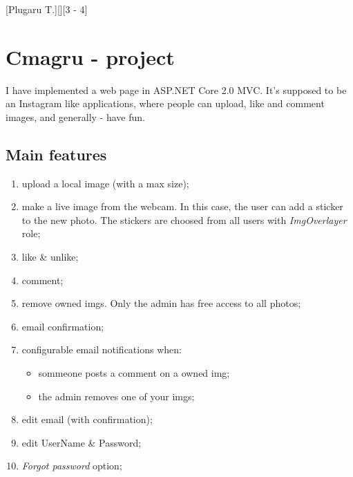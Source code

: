 \documentclass{article}
\begin{document}
	[Plugaru T.][][3 - 4]

	\section{Cmagru - project}
		I have implemented a web page in ASP.NET Core 2.0 MVC. It's supposed to be an Instagram like applications, where people can upload, like and comment images, and generally - have fun.

		\subsection{Main features}
			\begin{enumerate}
				\item upload a local image (with a max size);
				\item make a live image from the webcam. In this case, the user can add a sticker to the new photo. The stickers are choosed from all users with \textit{ImgOverlayer} role;
				\item like \& unlike;
				\item comment;
				\item remove owned imgs. Only the admin has free access to all photos;
				\item email confirmation;
				\item configurable email notifications when:
					\begin{itemize}
						\item sommeone posts a comment on a owned img;
						\item the admin removes one of your imgs;
					\end{itemize}
				\item edit email (with confirmation);
				\item edit UserName \& Password;
				\item \textit{Forgot password} option;
			\end{enumerate}
\end{document}
